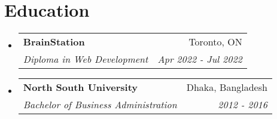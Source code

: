 \documentclass[letterpaper,11pt]{article}
\makeatletter
\newcommand{\resumeSubheading}[4]{
  \vspace{-2pt}\item
    \begin{tabular*}{0.97\textwidth}[t]{l@{\extracolsep{\fill}}r}
      \textbf{#1} & #2 \\
      \textit{\small#3} & \textit{\small #4} \\
    \end{tabular*}\vspace{-7pt}
}
\newcommand{\resumeSubHeadingListStart}{\begin{itemize}[leftmargin=0.15in, label={}]}
\newcommand{\resumeSubHeadingListEnd}{\end{itemize}}
\makeatother
\begin{document}
%

\section{Education}
  \resumeSubHeadingListStart
    \resumeSubheading
      {BrainStation}{Toronto, ON}
      {Diploma in Web Development}{Apr 2022 - Jul 2022}
    \resumeSubheading
      {North South University}{Dhaka, Bangladesh}
      {Bachelor of Business Administration}{2012 - 2016}
  \resumeSubHeadingListEnd


\end{document}
